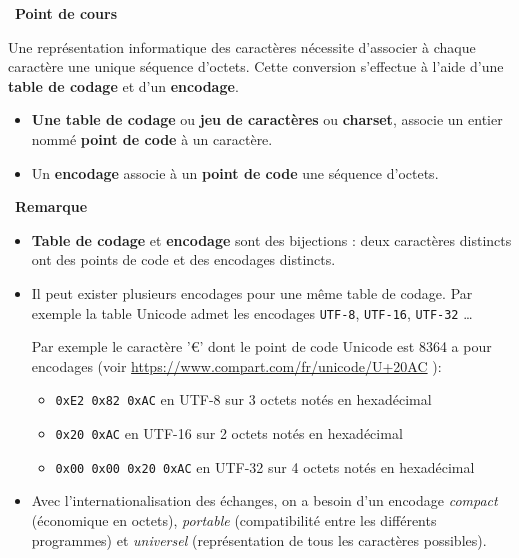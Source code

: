 \documentclass[a4paper, french, 12pt]{article}  %
\newcounter{rque}
\newenvironment{remarque}
{\par \medskip    \addtocounter{rque}{1} \noindent  
\begin{bclogo}[arrondi =0.1,  ombre = true, barre=snake, noborder = true, logo=\bcinfo, marge=0]{~\textbf{Remarque} \textbf{\therque}}  \par }
{
\end{bclogo}
 \par \bigskip }
\newcounter{cours}
\newenvironment{cours}[1]
{\par \medskip   \addtocounter{cours}{1} \noindent  
\begin{bclogo}[arrondi =0.1,  ombre = true, barre=none, logo=\bcbook, marge=4]{~\textbf{Point de cours} \textbf{\thecours} {\itshape #1} }  \par}
{
\end{bclogo}
 \par \bigskip }
\newcounter{prog}
\begin{document}

\vspace*{-20pt}


\begin{cours}{}
Une représentation informatique des caractères nécessite d'associer à chaque caractère une unique séquence d'octets.  Cette conversion s'effectue à l'aide  d'une \textbf{table de codage} et d'un \textbf{encodage}.
\begin{itemize}[label=]

 \item \textbf{Une table de codage} ou \textbf{jeu de caractères} ou  \textbf{charset}, associe  un    entier  nommé  \textbf{point de code} à un caractère.
 \item Un \textbf{encodage}  associe à un \textbf{point de code} une séquence d'octets.
 
 \end{itemize}
 
\end{cours}

\vspace*{-20pt}

\begin{remarque}{}
\begin{itemize}
\item \textbf{Table de codage} et \textbf{encodage}  sont des bijections : deux caractères distincts ont des points de code et des encodages  distincts.
\item Il peut exister plusieurs encodages pour une même table de codage. Par exemple la table Unicode admet les encodages \texttt{UTF-8}, \texttt{UTF-16}, \texttt{UTF-32} \ldots 

Par exemple le  caractère '€' dont le point de code Unicode est 8364 a pour encodages (voir \url{https://www.compart.com/fr/unicode/U+20AC} ): 

\begin{itemize}
	\item \verb+0xE2 0x82 0xAC+ en UTF-8  sur 3 octets notés en hexadécimal
     \item \verb+0x20 0xAC+ en UTF-16 sur 2 octets  notés en hexadécimal
     \item \verb+0x00 0x00 0x20 0xAC+ en UTF-32 sur 4 octets notés en hexadécimal
\end{itemize}



\item Avec l'internationalisation des échanges, on a besoin d'un encodage  \textit{compact} (économique en octets), \textit{portable} (compatibilité entre les différents programmes) et \textit{universel} (représentation de tous les caractères possibles).
\end{itemize}


\end{remarque}
\end{document}
